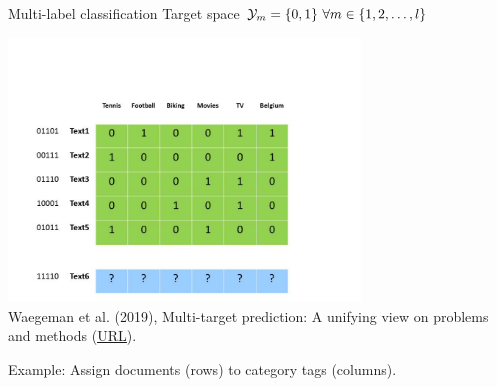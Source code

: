\documentclass[11pt,compress,t,notes=noshow, xcolor=table]{beamer}
\begin{document}
\begin{frame}{Multi-label classification}
Target space $\mathcal{Y}_m = \{0,1\} \  \forall m \in \{1, 2, \ldots, l\}$

            


		\begin{center}
			\includegraphics[width=0.7\textwidth,trim = 0 0 100 100,clip]{figure/Slide2} \tiny
			\\ Waegeman et al. (2019), Multi-target prediction:
			A unifying view on problems and methods (\href{https://arxiv.org/pdf/1809.02352.pdf}{\underline{URL}}).
		\end{center}

	Example: Assign documents (rows) to category tags (columns).

\end{frame}
\end{document}
